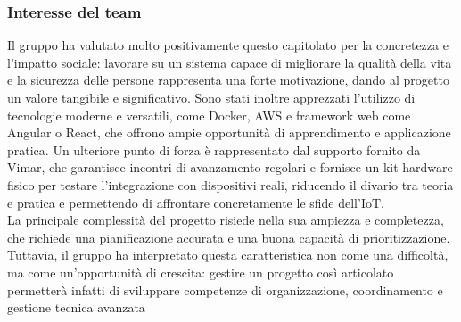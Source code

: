 \documentclass[a4paper,11pt]{article}
\begin{document}
\subsubsection{Interesse del team}
\parbox[t]{\linewidth}{%
Il gruppo ha valutato molto positivamente questo capitolato per la concretezza e
l'impatto sociale: lavorare su un sistema capace di migliorare la qualità della vita e
la sicurezza delle persone rappresenta una forte motivazione, dando al progetto un
valore tangibile e significativo. Sono stati inoltre apprezzati l'utilizzo di tecnologie
moderne e versatili, come Docker, AWS e framework web come Angular o React,
che offrono ampie opportunità di apprendimento e applicazione pratica. Un
ulteriore punto di forza è rappresentato dal supporto fornito da Vimar, che
garantisce incontri di avanzamento regolari e fornisce un kit hardware fisico per
testare l'integrazione con dispositivi reali, riducendo il divario tra teoria e pratica e
permettendo di affrontare concretamente le sfide dell'IoT.
\\
La principale complessità del progetto risiede nella sua ampiezza e completezza,
che richiede una pianificazione accurata e una buona capacità di prioritizzazione.
Tuttavia, il gruppo ha interpretato questa caratteristica non come una difficoltà, ma
come un'opportunità di crescita: gestire un progetto così articolato permetterà
infatti di sviluppare competenze di organizzazione, coordinamento e gestione
tecnica avanzata
}
\end{document}

